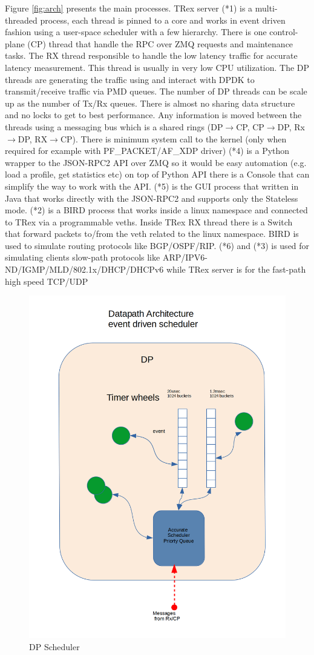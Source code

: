 \documentclass[conference]{IEEEtran}
\begin{document}
Figure \ref{fig:arch} presents the main processes. TRex server (*1) is a multi-threaded process, each thread is pinned to a core and works in 
event driven fashion using a user-space scheduler with a few hierarchy. There is one control-plane (CP) thread that handle the RPC over ZMQ requests and maintenance tasks. 
The RX thread responsible to handle the low latency traffic for accurate latency measurement. This thread is usually in very low CPU utilization. 
The DP threads are generating the traffic using and interact with DPDK to transmit/receive traffic via PMD queues. 
The number of DP threads can be scale up as the number of Tx/Rx queues. 
There is almost no sharing data structure and no locks to get to best performance. 
Any information is moved between the threads using a messaging bus which 
is a shared rings (DP$\rightarrow$CP, CP$\rightarrow$DP, Rx$\rightarrow$DP, RX$\rightarrow$CP).
There is minimum system call to the kernel (only when required for example with PF\_PACKET/AF\_XDP driver)
(*4) is a Python wrapper to the JSON-RPC2 API over ZMQ so it would be easy automation (e.g. load a profile, get statistics etc)
on top of Python API there is a Console that can simplify the way to work with the API. 
(*5) is the GUI process that written in Java that works directly with the JSON-RPC2 and supports only the Stateless mode.
(*2) is a BIRD \cite{b4} process that works inside a linux namespace and connected to TRex via a programmable veths. Inside TRex RX thread there is a Switch that forward packets to/from the veth related to the linux namespace. BIRD is used to simulate routing protocols like BGP/OSPF/RIP.
(*6) and (*3) is used for simulating clients slow-path protocols like ARP/IPV6-ND/IGMP/MLD/802.1x/DHCP/DHCPv6 while TRex server is for the fast-path high speed TCP/UDP

\begin{figure}[h]
  \includegraphics[width=0.3
  \textwidth, center]{trex_dp_sheduler.png}
  \caption{DP Scheduler}
  \label{fig:dp_schduler}
\end{figure}
  
\end{document}
